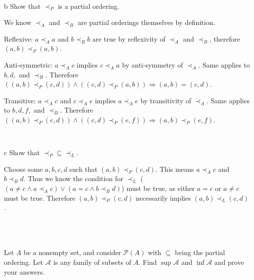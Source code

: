 \documentclass{article}
\begin{document}

\

\begin{problem} b
Show that $\prec_P$ is a partial ordering. 
\end{problem}

We know $\prec _{A}$ and $\prec _{B}$ are partial orderings themselves by definition.

Reflexive: $a\prec _{A} a$ and $b\prec _{B} b$ are true by reflexivity of $\prec _{A}$ and $\prec _{B}$, therefore $( a,b) \prec _{P}( a,b)$.

Anti-symmetric: $a\prec _{A} c$ implies $c\prec _{A} a$ by anti-symmetry of $\prec _{A}$. Same applies to $b,d,$ and $\prec _{B}$. Therefore $(( a,b) \prec _{P}( c,d)) \land (( c,d) \prec _{P}( a,b)) \Rightarrow ( a,b) =( c,d)$.

Transitive: $a\prec _{A} c$ and $c\prec _{A} e$ implies $a\prec _{A} e$ by transitivity of $\prec _{A}$. Same applies to $b,d,f,$ and $\prec _{B}$. Therefore $(( a,b) \prec _{P}( c,d)) \land (( c,d) \prec _{P}( e,f)) \Rightarrow ( a,b) \prec _{P}( e,f)$.

\

\begin{problem} c
Show that $\prec_P \subseteq \prec_L$.
\end{problem}

Choose some $a,b,c,d$ such that $( a,b) \prec _{P}( c,d)$. This means $a\prec _{A} c$ and $b\prec _{B} d$. Thus we know the condition for $\prec _{L}$ ($(a\neq c\land a\prec _{A} c)\lor (a=c\land b\prec _{B} d)$) must be true, as either $a=c$ or $a\neq c$ must be true. Therefore $( a,b) \prec _{P}( c,d)$ necessarily implies $( a,b) \prec _{L}( c,d)$.

\
\hline
\section{}

\begin{problem*}
Let $A$ be a nonempty set, and consider $\mathcal{P}(A)$ with $\subseteq$ being the partial ordering. Let $\mathcal{A}$ is any family of subsets of $A$. Find $\sup \mathcal{A}$ and $\inf\mathcal{A}$ and prove your answers.
\end{problem*}
\end{document}
